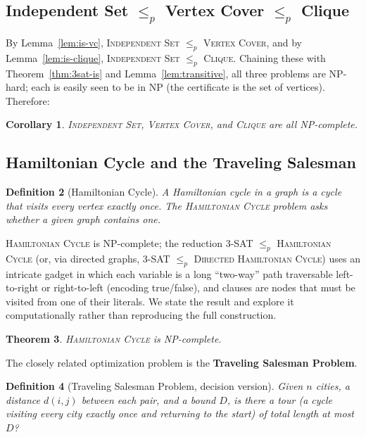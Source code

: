 \documentclass[11pt]{article}
\newtheorem{theorem}{Theorem}[section]
\newtheorem{corollary}[theorem]{Corollary}
\newtheorem{definition}[theorem]{Definition}
\begin{document}
\subsection{Independent Set \texorpdfstring{$\le_p$}{<=p} Vertex Cover \texorpdfstring{$\le_p$}{<=p} Clique}

By Lemma~\ref{lem:is-vc}, \textsc{Independent Set} $\le_p$ \textsc{Vertex Cover}, and by
Lemma~\ref{lem:is-clique}, \textsc{Independent Set} $\le_p$ \textsc{Clique}. Chaining these
with Theorem~\ref{thm:3sat-is} and Lemma~\ref{lem:transitive}, all three problems are
NP-hard; each is easily seen to be in $\mathrm{NP}$ (the certificate is the set of
vertices). Therefore:

\begin{corollary}
\textsc{Independent Set}, \textsc{Vertex Cover}, and \textsc{Clique} are all NP-complete.
\end{corollary}

\subsection{Hamiltonian Cycle and the Traveling Salesman}

\begin{definition}[Hamiltonian Cycle]
A \emph{Hamiltonian cycle} in a graph is a cycle that visits every vertex exactly once. The
\textsc{Hamiltonian Cycle} problem asks whether a given graph contains one.
\end{definition}

\textsc{Hamiltonian Cycle} is NP-complete; the reduction \textsc{3-SAT} $\le_p$
\textsc{Hamiltonian Cycle} (or, via directed graphs, \textsc{3-SAT} $\le_p$ \textsc{Directed
Hamiltonian Cycle}) uses an intricate gadget in which each variable is a long ``two-way''
path traversable left-to-right or right-to-left (encoding true/false), and clauses are
nodes that must be visited from one of their literals. We state the result and explore it
computationally rather than reproducing the full construction.

\begin{theorem}
\textsc{Hamiltonian Cycle} is NP-complete.
\end{theorem}

The closely related optimization problem is the \textbf{Traveling Salesman Problem}.

\begin{definition}[Traveling Salesman Problem, decision version]
Given $n$ cities, a distance $d(i, j)$ between each pair, and a bound $D$, is there a tour
(a cycle visiting every city exactly once and returning to the start) of total length at
most $D$?
\end{definition}
\end{document}
